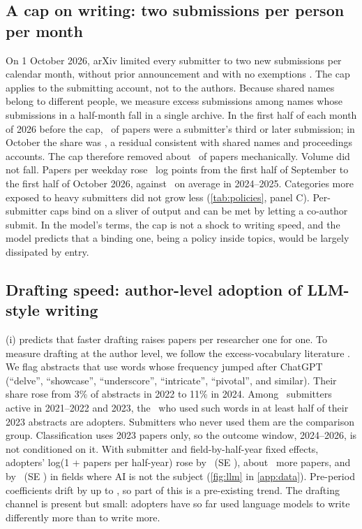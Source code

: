 \subsection{A cap on writing: two submissions per person per month}

On 1 October 2026, arXiv limited every submitter to two new submissions per
calendar month, without prior announcement and with no exemptions
\citep{arxivratelimit2026}. The cap applies to the submitting account, not to the
authors. Because shared names belong to different people, we measure excess
submissions among names whose submissions in a half-month fall in a single
archive. In the first half of each month of 2026 before the cap, \empCapPre\ of
papers were a submitter's third or later submission; in October the share was
\empCapOct, a residual consistent with shared names and proceedings accounts. The
cap therefore removed about \empCapRemoved\ of papers mechanically. Volume did not
fall. Papers per weekday rose \empCapVol\ log points from the first half of
September to the first half of October 2026, against \empCapVolPrev\ on average in
2024--2025. Categories more exposed to heavy submitters did not grow less
(\cref{tab:policies}, panel C). Per-submitter caps bind on a sliver of output
and can be met by letting a co-author submit. In the model's terms, the cap
is not a shock to writing speed, and the model predicts that a binding one,
being a policy inside topics, would be largely dissipated by entry.

\subsection{Drafting speed: author-level adoption of LLM-style writing}

(i) predicts that faster drafting raises papers per researcher one
for one. To measure drafting at the author level, we follow the
excess-vocabulary literature \citep{liangetal2024,kobaketal2025}. We flag
abstracts that use words whose frequency jumped after ChatGPT (``delve'',
``showcase'', ``underscore'', ``intricate'', ``pivotal'', and similar). Their share
rose from 3\% of abstracts in 2022 to 11\% in 2024. Among \empLLMn\ submitters
active in 2021--2022 and 2023, the \empLLMadopters\ who used such words in at
least half of their 2023 abstracts are adopters. Submitters who never used them
are the comparison group. Classification uses 2023 papers only, so the outcome
window, 2024--2026, is not conditioned on it. With submitter and field-by-half-year
fixed effects, adopters' log(1 + papers per half-year) rose by \empLLMall\ (SE
\empLLMallSE), about \empLLMallPct\ more papers, and by \empLLMnonai\ (SE
\empLLMnonaiSE) in fields where AI is not the subject (\cref{fig:llm} in
\cref{app:data}). Pre-period coefficients drift by up to \empLLMpre, so part of
this is a pre-existing trend. The drafting channel is present but small:
adopters have so far used language models to write differently more than to
write more.

